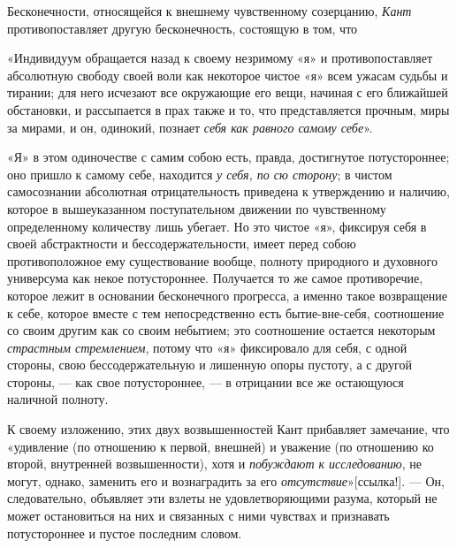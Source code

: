 {Бесконечности, относящейся к внешнему чувственному созерцанию,
{\em Кант} противопоставляет другую бесконечность,
состоящую в том, что

«Индивидуум обращается назад к своему незримому «я» и противопоставляет
абсолютную свободу своей воли как некоторое чистое «я» всем ужасам судьбы и
тирании; для него исчезают все окружающие его вещи, начиная с его ближайшей
обстановки, и рассыпается в прах также и то, что представляется прочным,
миры за мирами, и он, одинокий, познает {\em себя как
равного самому себе}».

«Я» в этом одиночестве с самим собою есть, правда, достигнутое
потустороннее; оно пришло к самому себе, находится
{\em у себя, по сю сторону}; в чистом самосознании
абсолютная отрицательность приведена к утверждению и наличию, которое в
вышеуказанном поступательном движении по чувственному определенному
количеству лишь убегает. Но это чистое «я», фиксируя себя в своей
абстрактности и бессодержательности, имеет перед собою противоположное ему
существование вообще, полноту природного и духовного универсума как некое
потустороннее. Получается то же самое противоречие, которое лежит в
основании бесконечного прогресса, а именно такое возвращение к себе,
которое вместе с тем непосредственно есть бытие-вне-себя, соотношение со
своим другим как со своим небытием; это соотношение остается некоторым
{\em страстным стремлением}, потому что «я» фиксировало
для себя, с одной стороны, свою бессодержательную и лишенную опоры пустоту,
а с другой стороны, — как свое потустороннее, — в отрицании все же
остающуюся наличной полноту.

К своему изложению, этих двух возвышенностей Кант прибавляет замечание, что
«удивление (по отношению к первой, внешней) и уважение (по отношению ко
второй, внутренней возвышенности), хотя и
{\em побуждают к исследованию}, не могут, однако,
заменить его и вознаградить за его
{\em отсутствие}»[ссылка!]. — Он, следовательно,
объявляет эти взлеты не удовлетворяющими разума, который не может
остановиться на них и связанных с ними чувствах и признавать потустороннее
и пустое последним словом.

}
